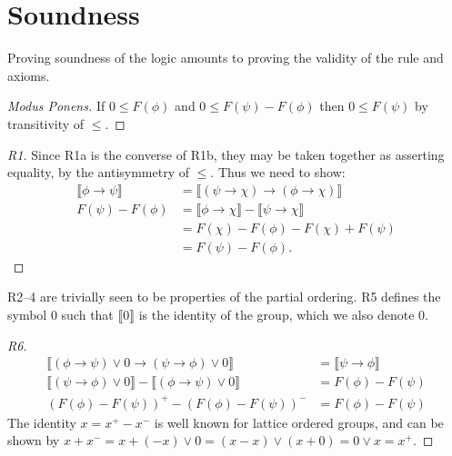 \documentclass[preprint,leqno]{elsarticle}
\newcommand{\interp}[1]{\llbracket #1 \rrbracket}
\begin{document}
\section{Soundness}

Proving soundness of the logic amounts to proving the validity of the
rule and axioms.


\begin{proof}[Modus Ponens]
If $0 \le F(\phi)$ and $0 \le F(\psi) - F(\phi)$ then
$0 \le F(\psi)$ by transitivity of $\le$.
\end{proof}

\begin{proof}[R1]
  Since R1a is the converse of R1b, they may be taken together as
  asserting equality, by the antisymmetry of $\le$. Thus we need to
  show:
  \begin{align*}
    \interp{\phi \rightarrow \psi} & = \interp{(\psi \rightarrow
      \chi) \rightarrow (\phi \rightarrow \chi)}\\
    F(\psi) - F(\phi) & = \interp{\phi \rightarrow \chi} -
    \interp{\psi \rightarrow \chi}\\
    & = F(\chi) - F(\phi) - F(\chi) + F(\psi)\\
    & = F(\psi) - F(\phi).
  \end{align*}
\end{proof}
R2--4 are trivially seen to be properties of the partial ordering. R5
defines the symbol 0 such that $\interp{0}$ is the identity of the
group, which we also denote 0.

\begin{proof}[R6]
\begin{align*}
  \interp{(\phi \rightarrow \psi)\lor 0 \rightarrow (\psi \rightarrow \phi) \lor 0} &= \interp{\psi \rightarrow \phi}\\
  \interp{(\psi \rightarrow \phi) \lor 0} - \interp{(\phi \rightarrow \psi)\lor 0} &= F(\phi) - F(\psi)\\
  (F(\phi) - F(\psi))^+ - (F(\phi) - F(\psi))^- & =F(\phi) - F(\psi)
\end{align*}
The identity $x = x^+ - x^-$ is
well known for lattice ordered groups, and can be shown by $x + x^- =
x + (-x)\lor 0 = (x - x)\lor(x + 0) = 0\lor x = x^+$.
\end{proof}
\end{document}
